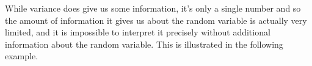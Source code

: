 \documentclass[10pt]{article}
\theoremstyle{definition}
\newcommand{\1}[1]{\textbf{1}_{\left[#1\right]}} %
\def\E{\mathbb{E}} %
\def\Var{\mathrm{Var}} %
\begin{document}


While variance does give us some information, it's only a single number and so the amount of information
it gives us about the random variable is actually very limited, and it is impossible to interpret it
precisely without additional information about the random variable. This is illustrated in the following
example.
\end{document}
